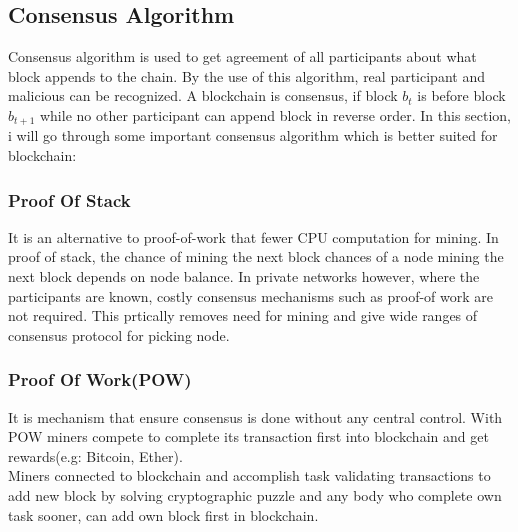 \subsection{Consensus Algorithm}
Consensus algorithm is used to get agreement of all participants about what block appends to the chain. By the use of this algorithm, real participant and malicious can be recognized. A blockchain is consensus, if block $b_t$ is before block$b_{t+1}$  while no other participant can append block in reverse order. In this section, i will go through some important consensus algorithm which is better suited for blockchain\cite{Kevin}:
\subsubsection{Proof Of Stack}
It is an alternative to proof-of-work that fewer CPU computation for mining. In proof of stack, the chance of mining the next block 
chances of a node mining the next block depends on node balance. 
In private networks however, where the participants are known, costly consensus mechanisms such as proof-of work are not required. This prtically removes need for mining and give wide ranges of consensus protocol for picking node\cite{Christidis}.

\subsubsection{Proof Of Work(POW)}
It is mechanism that ensure consensus is done without any central control. With POW miners compete to complete its transaction first into blockchain and get rewards(e.g: Bitcoin, Ether).\\
Miners connected to blockchain and accomplish task validating transactions to add new block by solving cryptographic puzzle and any body who complete own task sooner, can add own block first in blockchain\cite{Pablo}.

